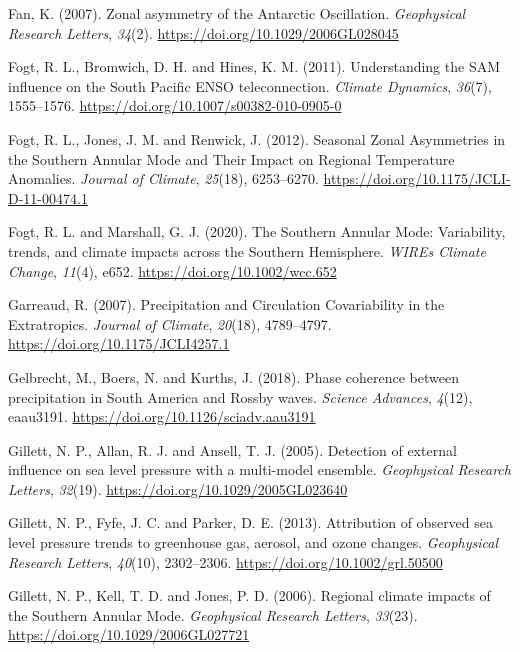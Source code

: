 \documentclass[12pt,oneside,a4paper]{reedthesis}
\newlength{\cslhangindent}
\newenvironment{CSLReferences}[2] %
 {%
  \setlength{\parindent}{0pt}
  \ifodd #1 \everypar{\setlength{\hangindent}{\cslhangindent}}\ignorespaces\fi
  \ifnum #2 > 0
  \setlength{\parskip}{#2\baselineskip}
  \fi
 }%
 {}
\begin{document}
\begin{CSLReferences}{1}{0}
\leavevmode{}%
Fan, K. (2007). Zonal asymmetry of the {Antarctic Oscillation}. \emph{Geophysical Research Letters}, \emph{34}(2). \url{https://doi.org/10.1029/2006GL028045}

\leavevmode{}%
Fogt, R. L., Bromwich, D. H. and Hines, K. M. (2011). Understanding the {SAM} influence on the {South Pacific ENSO} teleconnection. \emph{Climate Dynamics}, \emph{36}(7), 1555--1576. \url{https://doi.org/10.1007/s00382-010-0905-0}

\leavevmode{}%
Fogt, R. L., Jones, J. M. and Renwick, J. (2012). Seasonal {Zonal Asymmetries} in the {Southern Annular Mode} and {Their Impact} on {Regional Temperature Anomalies}. \emph{Journal of Climate}, \emph{25}(18), 6253--6270. \url{https://doi.org/10.1175/JCLI-D-11-00474.1}

\leavevmode{}%
Fogt, R. L. and Marshall, G. J. (2020). The {Southern Annular Mode}: {Variability}, trends, and climate impacts across the {Southern Hemisphere}. \emph{WIREs Climate Change}, \emph{11}(4), e652. \url{https://doi.org/10.1002/wcc.652}

\leavevmode{}%
Garreaud, R. (2007). Precipitation and {Circulation Covariability} in the {Extratropics}. \emph{Journal of Climate}, \emph{20}(18), 4789--4797. \url{https://doi.org/10.1175/JCLI4257.1}

\leavevmode{}%
Gelbrecht, M., Boers, N. and Kurths, J. (2018). Phase coherence between precipitation in {South America} and {Rossby} waves. \emph{Science Advances}, \emph{4}(12), eaau3191. \url{https://doi.org/10.1126/sciadv.aau3191}

\leavevmode{}%
Gillett, N. P., Allan, R. J. and Ansell, T. J. (2005). Detection of external influence on sea level pressure with a multi-model ensemble. \emph{Geophysical Research Letters}, \emph{32}(19). \url{https://doi.org/10.1029/2005GL023640}

\leavevmode{}%
Gillett, N. P., Fyfe, J. C. and Parker, D. E. (2013). Attribution of observed sea level pressure trends to greenhouse gas, aerosol, and ozone changes. \emph{Geophysical Research Letters}, \emph{40}(10), 2302--2306. \url{https://doi.org/10.1002/grl.50500}

\leavevmode{}%
Gillett, N. P., Kell, T. D. and Jones, P. D. (2006). Regional climate impacts of the {Southern Annular Mode}. \emph{Geophysical Research Letters}, \emph{33}(23). \url{https://doi.org/10.1029/2006GL027721}


\end{CSLReferences}
\end{document}
